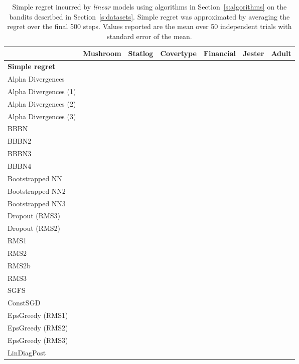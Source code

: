 \documentclass{article} \usepackage{iclr2018_conference,times}
\begin{document}
\begin{landscape}
\begin{table}[ht]
 \end{table}
\end{landscape}

\begin{landscape}
\begin{table}[ht]
  \caption{Simple regret incurred by \emph{linear} models using algorithms in Section~\ref{s:algorithms} on the bandits described in Section~\ref{s:datasets}. Simple regret was approximated by averaging the regret over the final 500 steps. Values reported are the mean over 50 independent trials with standard error of the mean.}
  \label{tab:linear_simple_regret_appendix}
  \centering
  \footnotesize
  \tiny
  \begin{tabular}{lllllll}
    & Mushroom & Statlog & Covertype & Financial & Jester & Adult \\
    \midrule
\textbf{Simple regret } & & & & & &  \\
    \midrule
Alpha Divergences & & & & \bm{}& &  \\
Alpha Divergences (1) & & & & \bm{}& &  \\
Alpha Divergences (2) & & & & & &  \\
Alpha Divergences (3) & & & & \bm{}& &  \\
BBBN & & & \bm{}& & \bm{}& \bm{} \\
BBBN2 & & & \bm{}& & \bm{}&  \\
BBBN3 & & & & & \bm{}&  \\
BBBN4 & & & & & \bm{}&  \\
Bootstrapped NN & & \bm{}& & & & \bm{} \\
Bootstrapped NN2 & & \bm{}& & & \bm{}& \bm{} \\
Bootstrapped NN3 & & \bm{}& & & &  \\
Dropout (RMS3) & & & & & \bm{}&  \\
Dropout (RMS2) & & & & & &  \\
RMS1 & & & & & &  \\
RMS2 & & & & & \bm{}&  \\
RMS2b & & & & & \bm{}&  \\
RMS3 & & & & & &  \\
SGFS & & & & & &  \\
ConstSGD & & & & & &  \\
EpsGreedy (RMS1) & \bm{}& & & & &  \\
EpsGreedy (RMS2) & & & & & \bm{}&  \\
EpsGreedy (RMS3) & & \bm{}& & & \bm{}&  \\
LinDiagPost & & & & & \bm{}&  \\

\end{tabular}
\end{table}
\end{landscape}
\end{document}
